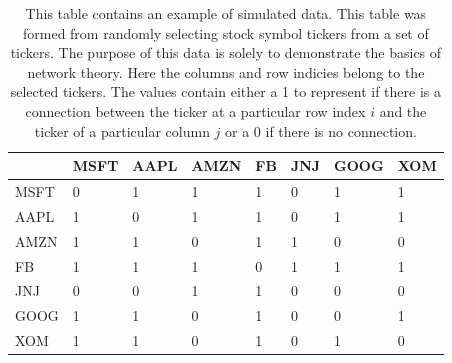 \begin{table}[htbp]
\begin{center}
    \begin{tabular}{|p{2cm}|p{1.5cm}|p{1.5cm}|p{1.5cm}|p{1.5cm}|p{1.5cm}|p{1.5cm}|p{1.5cm}|  }
        \hline
         & MSFT & AAPL & AMZN & FB & JNJ &  GOOG & XOM\\
        \hline
        MSFT  & 0 & 1 & 1 & 1  & 0 & 1 & 1 \\
        \hline
        AAPL & 1& 0 & 1 & 1 & 0 & 1 & 1 \\
        \hline
        AMZN & 1 & 1 & 0 & 1 & 1  & 0 & 0 \\
        \hline
        FB & 1 & 1 & 1 & 0  & 1 & 1 & 1 \\
        \hline
        JNJ & 0 & 0 & 1 & 1 & 0 & 0 & 0  \\ 
        \hline
        GOOG & 1 & 1 & 0 & 1 & 0 & 0 & 1 \\
        \hline
        XOM & 1 & 1 & 0 & 1 & 0 & 1 & 0  \\
        \hline
    \end{tabular}
\end{center}
\caption{ 
      This table contains an example of simulated data. This table was formed from randomly selecting stock symbol tickers from a set of tickers. The purpose of this data is solely to demonstrate the basics of network theory. Here the columns and row indicies belong to the selected tickers. The values contain either a 1 to represent if there is a connection between the ticker at a particular row index \(i\)  and the ticker of a particular column \(j\) or a 0 if there is no connection.
}

\label{tab:ExampleTable}
\end{table}


%
%


